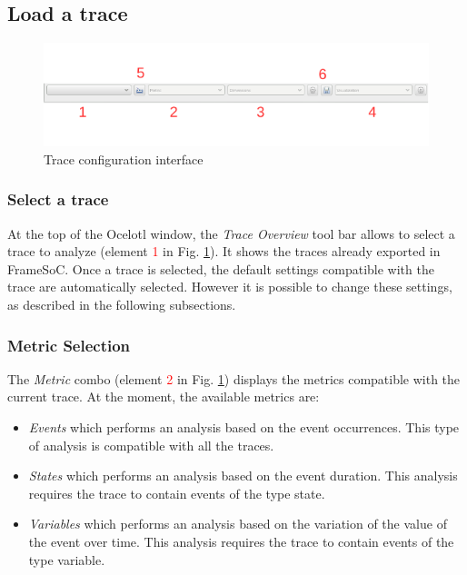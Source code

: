 \documentclass[twoside]{article}
\begin{document}
\begin{sloppypar}
\subsection{Load a trace}
\begin{figure}[h!]
	\centering
	\includegraphics[width=\textwidth]{images/traceSelection_labeled.pdf}
	\caption{Trace configuration interface}
	\label{traceConf}
\end{figure}

\subsubsection{Select a trace}

At the top of the Ocelotl window, the \textit{Trace Overview} tool bar allows to select a trace to analyze (element \textcolor{red}{1} in Fig. \ref{traceConf}). It shows the traces already exported in FrameSoC. Once a trace is selected, the default settings compatible with the trace are automatically selected. However it is possible to change these settings, as described in the following subsections. 

\subsubsection{Metric Selection}
The \textit{Metric} combo (element \textcolor{red}{2} in Fig. \ref{traceConf}) displays the metrics compatible with the current trace.
At the moment, the available metrics are: 
\begin{itemize}
	\item \textit{Events} which performs an analysis based on the event occurrences. This type of analysis is compatible with all the traces.
	\item \textit{States} which performs an analysis based on the event duration. This analysis requires the trace to contain events of the type state.
	\item \textit{Variables} which performs an analysis based on the variation of the value of the event over time. This analysis requires the trace to contain events of the type variable.
\end{itemize}


\end{sloppypar}
\end{document}
